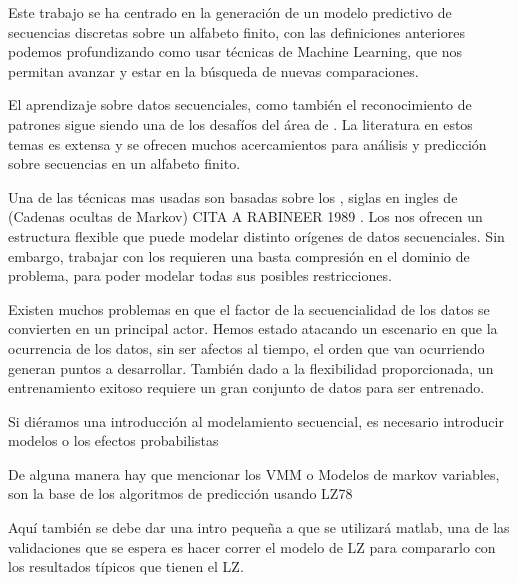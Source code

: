 


Este trabajo se ha centrado en la generación de un modelo predictivo de secuencias discretas sobre un alfabeto finito, con las definiciones anteriores podemos profundizando como usar técnicas de Machine Learning, que nos permitan avanzar y estar en la búsqueda de nuevas comparaciones.

El aprendizaje sobre datos secuenciales, como también el reconocimiento de patrones sigue siendo una de los desafíos del área de \machinelearning.
La literatura en estos temas es extensa y se ofrecen muchos acercamientos para análisis y predicción sobre secuencias en un alfabeto finito.

Una de las técnicas mas usadas son basadas sobre los \HMM, siglas en ingles de \hiddenmarkovmodels (Cadenas ocultas de Markov) CITA A RABINEER 1989 . Los \HMM nos ofrecen un estructura flexible que puede modelar distinto orígenes de datos secuenciales. Sin embargo, trabajar con los \HMM requieren una basta compresión en el dominio de problema, para poder modelar todas sus posibles restricciones.


Existen muchos problemas en que el factor de la secuencialidad de los datos se convierten en un principal actor. Hemos estado atacando un escenario en que la ocurrencia de los datos, sin ser afectos al tiempo, el orden que van ocurriendo generan puntos a desarrollar. También dado a la flexibilidad proporcionada, un entrenamiento exitoso requiere un gran conjunto de datos para ser entrenado.

 




Si diéramos una introducción al modelamiento secuencial, es necesario introducir modelos o los efectos probabilistas


De alguna manera hay que mencionar los VMM o Modelos de markov variables, son la base de los algoritmos de predicción usando LZ78



Aquí también se debe dar una intro pequeña a que se utilizará matlab, una de las validaciones que se espera es hacer correr el modelo de LZ para compararlo con los resultados típicos que tienen el LZ.

